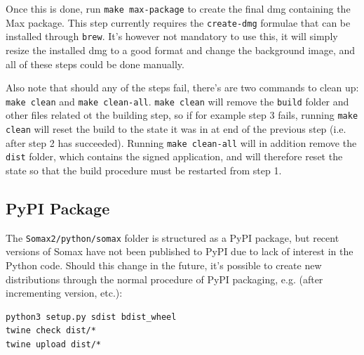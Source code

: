 Once this is done, run \texttt{make max-package} to create the final dmg containing the Max package. This step currently requires the \texttt{create-dmg} formulae that can be installed through \texttt{brew}. It's however not mandatory to use this, it will simply resize the installed dmg to a good format and change the background image, and all of these steps could be done manually.

Also note that should any of the steps fail, there's are two commands to clean up: \texttt{make clean} and \texttt{make clean-all}. \texttt{make clean} will remove the \texttt{build} folder and other files related ot the building step, so if for example step 3 fails, running \texttt{make clean} will reset the build to the state it was in at end of the previous step (i.e. after step 2 has succeeded). Running \texttt{make clean-all} will in addition remove the \texttt{dist} folder, which contains the signed application, and will therefore reset the state so that the build procedure must be restarted from step 1.


\subsection{PyPI Package}\label{ssec:2-pypi-package}
The \texttt{Somax2/python/somax} folder is structured as a PyPI package, but recent versions of Somax have not been published to PyPI due to lack of interest in the Python code. Should this change in the future, it's possible to create new distributions through the normal procedure of PyPI packaging, e.g. (after incrementing version, etc.):
\begin{lstlisting}
python3 setup.py sdist bdist_wheel
twine check dist/*
twine upload dist/*
\end{lstlisting}



